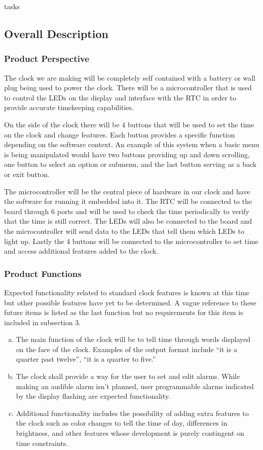 tasks\documentclass[onecolumn, draftclsnofoot,10pt, compsoc]{IEEEtran}
\begin{document}
\subsection{Overall Description}
\subsubsection{Product Perspective}
The clock we are making will be completely self contained with a battery
or wall plug being used to power the clock. There will be a microcontroller that is used to
control the LEDs on the display and interface with the RTC in order to provide accurate
timekeeping capabilities.

On the side of the clock there will be 4 buttons that will be used to set the time on the
clock and change features. Each button provides a specific function depending on the software
context. An example of this system when a basic menu is being manipulated would have two
buttons providing up and down scrolling, one button to select an option or submenu, and the
last button serving as a back or exit button.

The microcontroller will be the central piece of hardware in our clock and have the software
for running it embedded into it. The RTC will be connected to the board through 6 ports and
will be used to check the time periodically to verify that the time is still correct. The LEDs
will also be connected to the board and the microcontroller will send data to the LEDs that
tell them which LEDs to light up. Lastly the 4 buttons will be connected to the
microcontroller to set time and access additional features added to the clock.

\subsubsection{Product Functions}
Expected functionality related to standard clock features is known at this time
but other possible features have yet to be determined. A vague reference to these
future items is listed as the last function but no requirements for this item
is included in subsection 3.
\begin{enumerate}[a)]
  \item The main function of the clock will be to tell time through words displayed on the face of the
clock. Examples of the output format include “it is a quarter past twelve”, “it is a quarter to
five.”
  \item The clock shall provide a way for the user to set and edit alarms. While
  making an audible alarm isn't planned, user programmable alarms indicated by
  the display flashing are expected functionality.
  \item Additional functionality includes the possibility of adding extra features to the clock such as
color changes to tell the time of day, differences in brightness, and other features whose
development is purely contingent on time constraints.
\end{enumerate}
\end{document}
